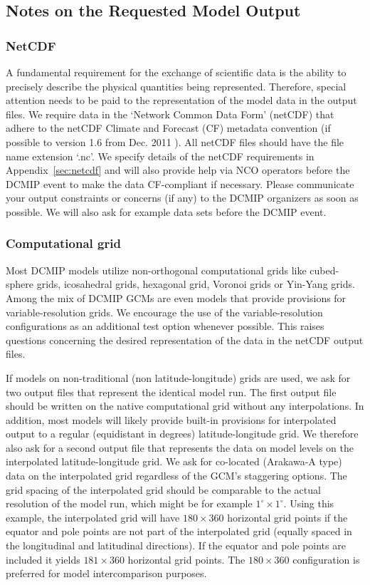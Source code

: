 \documentclass[times,doublespace]{fldauth}
\begin{document}
\subsection{Notes on the Requested Model Output}
\label{sec:notes_output}
\subsubsection{NetCDF}
A fundamental requirement for the exchange of scientific data is the ability to  precisely describe the physical quantities being represented. Therefore, special attention needs to be paid to the representation of the model data in the output files. We require data in the `Network Common Data Form' (netCDF) \cite{netcdf} that adhere to the netCDF Climate and Forecast (CF) metadata convention (if possible to version 1.6 from Dec. 2011 \cite{netcdf-cf}). All netCDF files should have the file name extension `.nc'.
We specify details of the netCDF requirements in Appendix~\ref{sec:netcdf} and will also provide help via NCO operators before the DCMIP event to make the data CF-compliant if necessary. Please communicate your output constraints or concerns (if any) to the DCMIP organizers as soon as possible. We will also ask for example data sets before the DCMIP event.

\subsubsection{Computational grid}
Most DCMIP models utilize non-orthogonal computational grids like cubed-sphere grids, icosahedral grids, hexagonal grid, Voronoi grids or Yin-Yang grids. Among the mix of DCMIP GCMs are even models that provide provisions for variable-resolution grids. We encourage the use of the variable-resolution configurations as an additional test option whenever possible.
This raises questions concerning the desired representation of the data in the netCDF output files. 

If models on non-traditional (non latitude-longitude) grids are used, we ask for two output files that represent the identical model run. The first output file should be written on the native computational grid without any interpolations. In addition, most models will likely provide built-in provisions for interpolated output to a regular (equidistant in degrees) latitude-longitude grid. We therefore also ask for a second output file that represents the data on model levels on the interpolated latitude-longitude grid. We ask for co-located  (Arakawa-A type) data on the interpolated grid regardless of the GCM's staggering options. The grid spacing of the interpolated grid should be comparable to the actual resolution of the model run, which might be for example $1^\circ \times 1^\circ$. Using this example, the interpolated grid will have $180 \times 360$ horizontal grid points if the equator and pole points are not part of the interpolated grid (equally spaced in the longitudinal and latitudinal directions). If the equator and pole points are included it yields $181 \times 360$ horizontal grid points. The $180 \times 360$ configuration is preferred for model intercomparison purposes.
\end{document}
